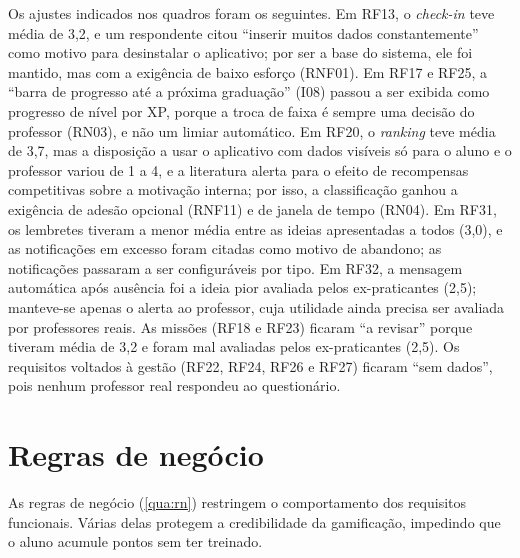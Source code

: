 Os ajustes indicados nos quadros foram os seguintes. Em RF13, o
\textit{check-in} teve média de 3,2, e um respondente citou ``inserir muitos
dados constantemente'' como motivo para desinstalar o aplicativo; por ser a
base do sistema, ele foi mantido, mas com a exigência de baixo esforço
(RNF01). Em RF17 e RF25, a ``barra de progresso até a próxima graduação''
(I08) passou a ser exibida como progresso de nível por XP, porque a troca
de faixa é sempre uma decisão do professor (RN03), e não um limiar
automático. Em RF20, o \textit{ranking} teve média de 3,7, mas a
disposição a usar o aplicativo com dados visíveis só para o aluno e o
professor variou de 1 a 4, e a literatura alerta para o efeito de
recompensas competitivas sobre a motivação interna; por isso, a
classificação ganhou a exigência de adesão opcional (RNF11) e de janela de
tempo (RN04). Em RF31, os lembretes tiveram a menor média entre as ideias
apresentadas a todos (3,0), e as notificações em excesso foram citadas
como motivo de abandono; as notificações passaram a ser configuráveis por
tipo. Em RF32, a mensagem automática após ausência foi a ideia pior
avaliada pelos ex-praticantes (2,5); manteve-se apenas o alerta ao
professor, cuja utilidade ainda precisa ser avaliada por professores
reais. As missões (RF18 e RF23) ficaram ``a revisar'' porque tiveram média
de 3,2 e foram mal avaliadas pelos ex-praticantes (2,5). Os requisitos
voltados à gestão (RF22, RF24, RF26 e RF27) ficaram ``sem dados'', pois
nenhum professor real respondeu ao questionário.

\section{Regras de negócio}
\label{sec:rn}

As regras de negócio (\autoref{qua:rn}) restringem o comportamento dos
requisitos funcionais. Várias delas protegem a credibilidade da
gamificação, impedindo que o aluno acumule pontos sem ter treinado.


